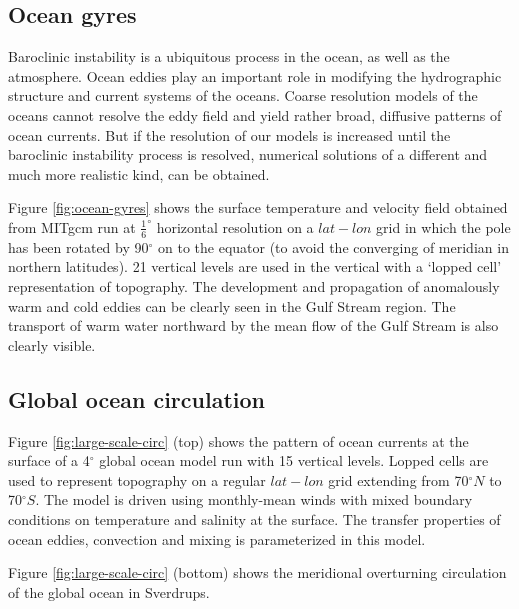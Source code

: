 

\subsection{Ocean gyres}

Baroclinic instability is a ubiquitous process in the ocean, as well as the
atmosphere. Ocean eddies play an important role in modifying the
hydrographic structure and current systems of the oceans. Coarse resolution
models of the oceans cannot resolve the eddy field and yield rather broad,
diffusive patterns of ocean currents. But if the resolution of our models is
increased until the baroclinic instability process is resolved, numerical
solutions of a different and much more realistic kind, can be obtained.

Figure \ref{fig:ocean-gyres} shows the surface temperature and velocity 
field obtained from MITgcm run at $\frac{1}{6}^{\circ }$ horizontal 
resolution on a $lat-lon$
grid in which the pole has been rotated by 90$^{\circ }$ on to the equator
(to avoid the converging of meridian in northern latitudes). 21 vertical
levels are used in the vertical with a `lopped cell' representation of
topography. The development and propagation of anomalously warm and cold
eddies can be clearly seen in the Gulf Stream region. The transport of
warm water northward by the mean flow of the Gulf Stream is also clearly
visible.




\subsection{Global ocean circulation}

Figure \ref{fig:large-scale-circ} (top) shows the pattern of ocean currents at 
the surface of a 4$^{\circ }$
global ocean model run with 15 vertical levels. Lopped cells are used to
represent topography on a regular $lat-lon$ grid extending from 70$^{\circ
}N $ to 70$^{\circ }S$. The model is driven using monthly-mean winds with
mixed boundary conditions on temperature and salinity at the surface. The
transfer properties of ocean eddies, convection and mixing is parameterized
in this model.

Figure \ref{fig:large-scale-circ} (bottom) shows the meridional overturning 
circulation of the global ocean in Sverdrups.



